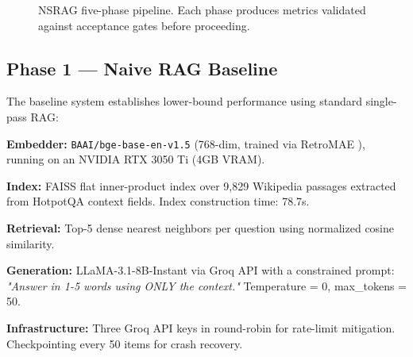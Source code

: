 \documentclass[conference]{IEEEtran}
\begin{document}
\begin{figure}[t]
\centering
{}
\caption{NSRAG five-phase pipeline. Each phase produces metrics validated against acceptance gates before proceeding.}
\label{fig:arch}
\end{figure}

\subsection{Phase 1 — Naive RAG Baseline}
\label{sec:phase1}

The baseline system establishes lower-bound performance using standard single-pass RAG:

\textbf{Embedder:} \texttt{BAAI/bge-base-en-v1.5} (768-dim, trained via RetroMAE \cite{liu2022retromae}), running on an NVIDIA RTX 3050 Ti (4GB VRAM).

\textbf{Index:} FAISS flat inner-product index over 9,829 Wikipedia passages extracted from HotpotQA context fields. Index construction time: 78.7s.

\textbf{Retrieval:} Top-5 dense nearest neighbors per question using normalized cosine similarity.

\textbf{Generation:} LLaMA-3.1-8B-Instant via Groq API with a constrained prompt: \textit{"Answer in 1-5 words using ONLY the context."} Temperature = 0, max\_tokens = 50.

\textbf{Infrastructure:} Three Groq API keys in round-robin for rate-limit mitigation. Checkpointing every 50 items for crash recovery.
\end{document}
